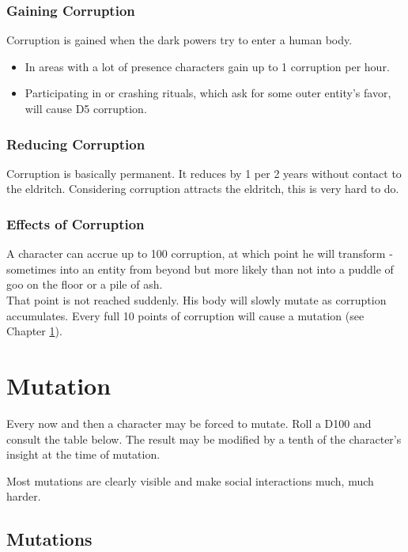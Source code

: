 \documentclass[12pt,a4paper,openany]{book}
\begin{document}
	\subsection{Gaining Corruption}
	Corruption is gained when the dark powers try to enter a human body. 
	\vspace{-8mm}
	\begin{itemize}
		\setlength\itemsep{-8mm}
		\item In areas with a lot of presence characters gain up to 1 corruption per hour.
		\item Participating in or crashing rituals, which ask for some outer entity's favor, will cause D5 corruption.
	\end{itemize}
	\subsection{Reducing Corruption}
	Corruption is basically permanent. It reduces by 1 per 2 years without contact to the eldritch. Considering corruption attracts the eldritch, this is very hard to do.
	\subsection{Effects of Corruption}
	A character can accrue up to 100 corruption, at which point he will transform - sometimes into an entity from beyond but more likely than not into a puddle of goo on the floor or a pile of ash.\\
	That point is not reached suddenly. His body will slowly mutate as corruption accumulates. Every full 10 points of corruption will cause a mutation (see Chapter \ref{ch:mutation}).
	
	\chapter{Mutation}
	\label{ch:mutation}
	Every now and then a character may be forced to mutate. Roll a D100 and consult the table below. The result may be modified by a tenth of the character's insight at the time of mutation.
	\par
	Most mutations are clearly visible and make social interactions much, much harder.
	\section*{Mutations}
	\vspace{4mm}
	\begin{multicols}{2}
	\end{multicols}
	
\end{document}
